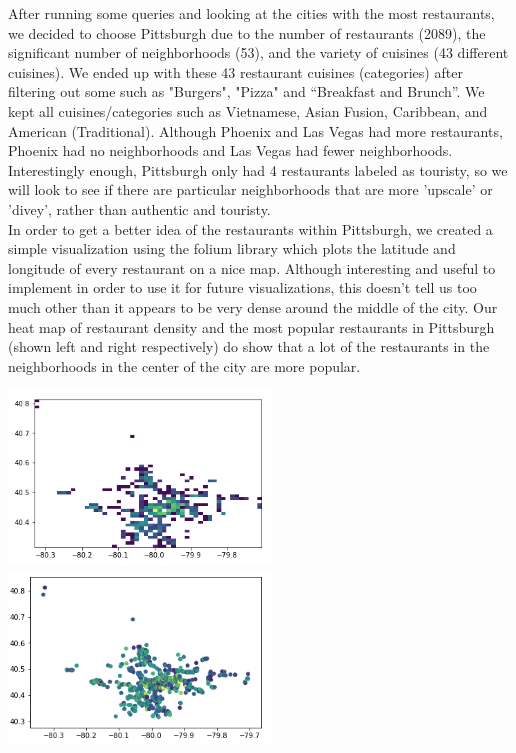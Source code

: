\documentclass{neu_handout}
\begin{document}
After running some queries and looking at the cities with the most restaurants, we decided to choose Pittsburgh due to the number of restaurants (2089), the significant number of neighborhoods (53), and the variety of cuisines (43 different cuisines). We ended up with these 43 restaurant
cuisines (categories) after filtering out some such as "Burgers", "Pizza" and “Breakfast and Brunch”. We kept all cuisines/categories such as Vietnamese, Asian Fusion, Caribbean, and American (Traditional). Although Phoenix and Las Vegas had more restaurants, Phoenix had no neighborhoods and Las Vegas had fewer neighborhoods. Interestingly enough, Pittsburgh only had 4 restaurants labeled as touristy, so we will look to see if there are particular neighborhoods that are more 'upscale' or 'divey', rather than authentic and touristy.\\

In order to get a better idea of the restaurants within Pittsburgh, we created a simple visualization using the folium library which plots the latitude and longitude of every restaurant on a nice map. Although interesting and useful to implement in order to use it for future visualizations, this doesn't tell us too much other than it appears to be very dense around the middle of the city. Our heat map of restaurant density and the most popular restaurants in Pittsburgh (shown left and right respectively) do show that a lot of the restaurants in the neighborhoods in the center of the city are more popular.

\begin{center}
\includegraphics[width=70mm,scale=0.5]{pa_rest_density}
\includegraphics[width=70mm,scale=0.5]{pa_popular_restaurants}
\end{center}
\end{document}
